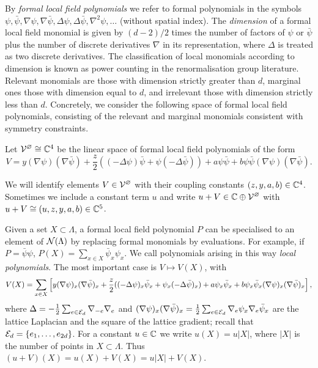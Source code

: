 \documentclass[11pt]{amsart}
\numberwithin{equation}{section}
\numberwithin{theorem}{section}
\newcommand{\1}{{\bf 1}}
\newcommand{\cVbulk}{\cV^\varnothing}
\begin{document}
By \emph{formal local field polynomials} we refer to formal polynomials in the symbols
$\psi,\bar\psi,\nabla\psi,\nabla\bar\psi,\Delta\psi,\Delta\bar\psi,\nabla^2\psi,\dots$ (without spatial index).
The \emph{dimension} of a formal local field monomial is given by $(d-2)/2$ times the number of factors of $\psi$ or $\bar\psi$
plus the number of discrete derivatives $\nabla$ in its
representation, where $\Delta$ is treated as two discrete derivatives.
The classification of local monomials according to dimension is known as power counting in the renormalisation group literature.
Relevant monomials are those with dimension strictly greater than $d$, marginal ones those with dimension equal to $d$,
and irrelevant those with dimension strictly less than $d$.
Concretely, we consider the following space of formal local field polynomials,
consisting of the relevant and marginal monomials consistent with symmetry constraints.

\begin{definition} \label{def:cV}
Let $\cVbulk \cong \C^4$ be the linear space of formal local field
polynomials of the form
\begin{equation} \label{e:V-def}
  V= y (\nabla\psi) (\nabla\bar\psi) + \frac{z}{2}((-\Delta\psi)\bar\psi + \psi(-\Delta\bar\psi))
  + a \psi\bar\psi + b \psi\bar\psi (\nabla \psi)(\nabla\bar\psi)
  .
\end{equation}
\end{definition}

We will identify elements $V\in\cVbulk$ with their coupling constants
$(z,y,a,b) \in \mathbb{C}^4$.  Sometimes we include a constant term $u$ and write
$u+V \in \C \oplus \cVbulk$ with $u+V\cong (u,z,y,a,b)\in\mathbb{C}^5$.
%

Given a set $X\subset \Lambda$, a formal local field polynomial $P$
can be specialised to an element of $\mathcal N(\Lambda)$ by replacing formal
monomials by evaluations. For example, if $P=\bar\psi\psi$,
$P(X) = \sum_{x\in X}\bar\psi_{x}\psi_{x}$. We call polynomials
arising in this way \emph{local polynomials}.  The most important case
is $V \mapsto V(X)$, with
\begin{equation} \label{e:VX}
  V(X) =
  \sum_{x\in X} \left[{ y (\nabla\psi)_x (\nabla\bar\psi)_x + \frac{z}{2}((-\Delta\psi)_x\bar\psi_x + \psi_x(-\Delta\bar\psi)_x) + a \psi_x\bar\psi_x + b \psi_x\bar\psi_x (\nabla \psi)_x(\nabla\bar\psi)_x}\right]
  ,
\end{equation}
where $\Delta = -\frac12 \sum_{e\in \mathcal E_d} \nabla_{-e}\nabla_{e}$
and
$(\nabla\psi)_{x}(\nabla\bar\psi)_{x} = \frac12
\sum_{e\in\mathcal E_d}\nabla_{e}\psi_{x}\nabla_{e}\bar\psi_{x}$ are the
lattice Laplacian and the square of the lattice gradient; recall that
$\mathcal E_d = \{e_1, \dots, e_{2d}\}$.  For a constant $u\in \mathbb{C}$ we write
$u(X) = u|X|$, where $|X|$ is the number of points in $X \subset
\Lambda$.  Thus $(u+V)(X)= u(X)+V(X)=u|X|+V(X)$.
\end{document}
